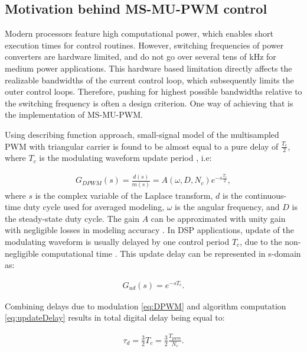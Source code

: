 \documentclass[conference]{IEEEtran}
\begin{document}
\subsection{Motivation behind MS-MU-PWM control}

Modern processors feature high computational power, which enables short execution times for control routines. However, switching frequencies of power converters are hardware limited, and do not go over several tens of kHz for medium power applications. This hardware based limitation directly affects the realizable bandwidths of the current control loop, which subsequently limits the outer control loops. Therefore, pushing for highest possible bandwidths relative to the switching frequency is often a design criterion. One way of achieving that is the implementation of MS-MU-PWM.

Using describing function approach, small-signal model of the multisampled PWM with triangular carrier is found to be almost equal to a pure delay of $\frac{T_c}{2}$, where $T_c$ is the modulating waveform update period \cite{corradini2018}, i.e:

\begin{equation}
\begin{aligned}
G_{DPWM} (s) = \frac{d(s)}{m(s)} = A(\omega,D,N_c) e^{-s\frac{T_c}{2}},
\label{eq:DPWM} 
\end{aligned}    
\end{equation}
where $s$ is the complex variable of the Laplace transform, $d$ is the continuous-time duty cycle used for averaged modeling, $\omega$ is the angular frequency, and $D$ is the steady-state duty cycle. The gain $A$ can be approximated with unity gain with negligible losses in modeling accuracy \cite{corradini2018}.
In DSP applications, update of the modulating waveform is usually delayed by one control period $T_c$, due to the non-negligible computational time \cite{Buso2015}. This update delay can be represented in s-domain as:

\begin{equation}
\begin{aligned}
G_{ud} (s) = e^{-sT_c}.
\label{eq:updateDelay} 
\end{aligned} 
\end{equation}

Combining delays due to modulation \eqref{eq:DPWM} and algorithm computation \eqref{eq:updateDelay} results in total digital delay being equal to:

\begin{equation}
\begin{aligned}
\tau_{d} = \frac{3}{2}T_c = \frac{3}{2} \frac{T_{pwm}}{N_c}.
\label{eq:tauD} 
\end{aligned}    
\end{equation}
\end{document}
